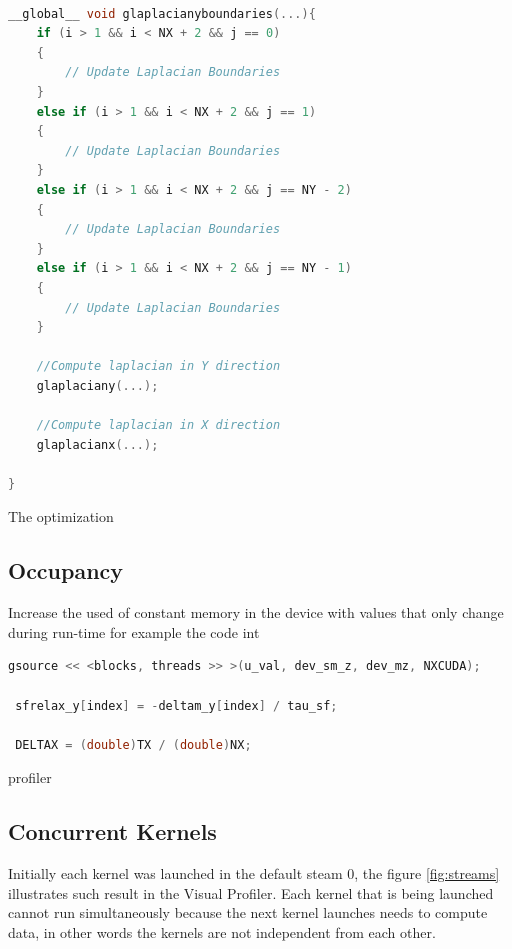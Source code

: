 \begin{lstlisting}[language=C++, caption={Evaluation of x, y, z coordinates of the Zhang and Li model in a single kernel}]

__global__ void glaplacianyboundaries(...){
    if (i > 1 && i < NX + 2 && j == 0)
    {
     	// Update Laplacian Boundaries
    }
    else if (i > 1 && i < NX + 2 && j == 1)
    {
  		// Update Laplacian Boundaries
    }
    else if (i > 1 && i < NX + 2 && j == NY - 2)
    {
        // Update Laplacian Boundaries
    }
    else if (i > 1 && i < NX + 2 && j == NY - 1)
    {
        // Update Laplacian Boundaries
    }
    
    //Compute laplacian in Y direction
    glaplaciany(...);

	//Compute laplacian in X direction
	glaplacianx(...);
    
}
\end{lstlisting}

The optimization

\subsection{Occupancy}
 
 
 
 Increase the used of constant memory in the device with values that only change during run-time for example the code int 
 
 
 \begin{lstlisting}[language=C++, caption={Evaluation of x, y, z coordinates of the Zhang and Li model in a single kernel}]
 gsource << <blocks, threads >> >(u_val, dev_sm_z, dev_mz, NXCUDA);
  
 sfrelax_y[index] = -deltam_y[index] / tau_sf;
     
 DELTAX = (double)TX / (double)NX;
\end{lstlisting}
 
 
profiler



 

\subsection{Concurrent Kernels}

Initially each kernel was launched in the default steam 0, the figure \ref{fig:streams} illustrates such result in the Visual Profiler. Each kernel that is being launched cannot run simultaneously because the next kernel launches needs to compute data, in other words the kernels are not independent from each other.

